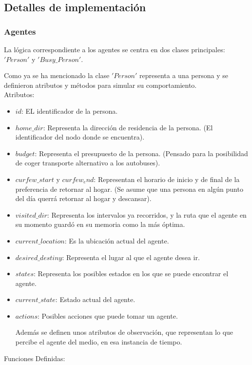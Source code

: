 \documentclass{article}
\begin{document}
\subsection{Detalles de implementación}
\subsubsection{Agentes}
La lógica correspondiente a los agentes se centra en dos clases principales: $'Person'$ y $'Busy\_Person'$. 

Como ya se ha mencionado la clase $'Person'$ representa a una persona y se definieron atributos y métodos para simular su comportamiento. 
\\

Atributos:
\begin{itemize}
    \item $id$: EL identificador de la persona.
    \item $home\_dir$: Representa la dirección de residencia de la persona. (El identificador del nodo donde se encuentra).
    \item $budget$: Representa el presupuesto de la persona. (Pensado para la posibilidad de coger transporte alternativo a los autobuses).
    \item $curfew\_start$ y $curfew_end$: Representan el horario de inicio y de final de la preferencia de retornar al hogar. (Se asume que una persona en algún punto del día querrá retornar al hogar y descansar).
    \item $visited\_dir$: Representa los intervalos ya recorridos, y la ruta que el agente en su momento guardó en su memoria como la más óptima.
    \item $current\_location$: Es la ubicación actual del agente.
    \item $desired\_destiny$: Representa el lugar al que el agente desea ir.
    \item $states$: Representa los posibles estados en los que se puede encontrar el agente. 
    \item $current\_state$: Estado actual del agente.
    \item $actions$: Posibles acciones que puede tomar un agente.
    
    Además se definen unos atributos de observación, que representan lo que percibe el agente del medio, en esa instancia de tiempo.
\end{itemize}

Funciones Definidas:
\end{document}
